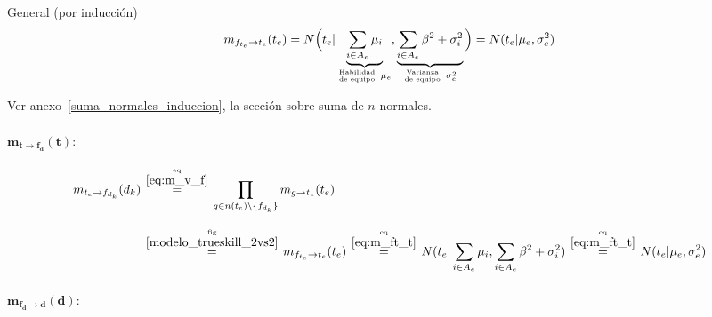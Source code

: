 \documentclass[article]{jss}
\newcommand\hfrac[2]{\genfrac{}{}{0pt}{}{#1}{#2}} %
\begin{document}
\begin{appendix}
\vspace{0.3cm}

General (por inducci\'on)
\begin{equation}\label{eq:m_ft_t}
 m_{f_{t_e} \rightarrow t_e}(t_e) =  N \Big( t_e | \underbrace{\sum_{i\in A_e } \mu_i}_{\hfrac{\text{Habilidad}}{\text{de equipo}} \ \mu_e}, \underbrace{\sum_{i \in A_e} \beta^2 + \sigma_i^2}_{\hfrac{\text{Varianza}}{\text{de equipo}} \ \sigma_e^2} \Big) = N(t_e | \mu_e, \sigma_e^2)
\end{equation}

Ver anexo~\ref{suma_normales_induccion}, la secci\'on sobre suma de $n$ normales.

\paragraph{$\bm{m_{t \rightarrow f_d}(t)}:$}

\begin{equation}\label{eq:m_t_fd}
\begin{split}
m_{t_e \rightarrow f_{d_{k}}}(d_{k}) & \overset{\hfrac{\text{eq}}{\ref{eq:m_v_f}}}{=} \prod_{g \in n(t_e) \setminus  \{f_{d_{k}} \}} m_{g \rightarrow t_e} (t_e) \\[0.3cm]
 & \overset{\hfrac{\text{fig}}{\ref{modelo_trueskill_2vs2}}}{=} m_{f_{t_e} \rightarrow t_e}(t_e) \overset{\hfrac{\text{eq}}{\ref{eq:m_ft_t}}}{=} N(t_e| \sum_{i \in A_e} \mu_i, \sum_{i \in A_e} \beta^2 + \sigma_i^2) \overset{\hfrac{\text{eq}}{\ref{eq:m_ft_t}}}{=} N(t_e|\mu_e,\sigma_e^2)
\end{split}
\end{equation}

\paragraph{$\bm{m_{f_d \rightarrow d}(d)}:$}


\end{appendix}
\end{document}
